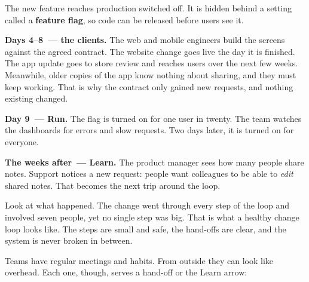 \noindent{}The new feature reaches production switched off. It is hidden behind a setting called a \textbf{feature flag}, so code can be released before users see it.

\textbf{Days 4--8~--- the clients.} The web and mobile engineers build the screens against the agreed contract. The website change goes live the day it is finished. The app update goes to store review and reaches users over the next few weeks. Meanwhile, older copies of the app know nothing about sharing, and they must keep working. That is why the contract only gained new requests, and nothing existing changed.

\textbf{Day 9~--- Run.} The flag is turned on for one user in twenty. The team watches the dashboards for errors and slow requests. Two days later, it is turned on for everyone.

\textbf{The weeks after~--- Learn.} The product manager sees how many people share notes. Support notices a new request: people want colleagues to be able to \emph{edit} shared notes. That becomes the next trip around the loop.

Look at what happened. The change went through every step of the loop and involved seven people, yet no single step was big. That is what a healthy change loop looks like. The steps are small and safe, the hand-offs are clear, and the system is never broken in between.

\label{the-same-process-in-a-team:the-rituals-and-what-they-are-for}

Teams have regular meetings and habits. From outside they can look like overhead. Each one, though, serves a hand-off or the Learn arrow:


